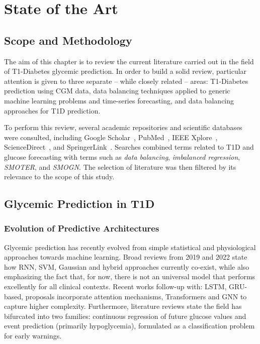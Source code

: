 
\chapter{State of the Art}
\label{chap:SoA}

\section{Scope and Methodology}
\label{sec:soa_scope_and_metholodogy}

The aim of this chapter is to review the current literature carried out in the field of T1-Diabetes glycemic prediction. In order to build a solid review, particular attention is given to three separate -- while closely related -- areas: T1-Diabetes prediction using CGM data, data balancing techniques applied to generic machine learning problems and time-series forecasting, and data balancing approaches for T1D prediction.

To perform this review, several academic repositories and scientific databases were consulted, including Google Scholar~\cite{google_scholar}, PubMed~\cite{pubmed}, IEEE Xplore~\cite{ieee_xplore}, ScienceDirect~\cite{sciencedirect}, and SpringerLink~\cite{springerlink}. Searches combined terms related to T1D and glucose forecasting with terms such as \textit{data balancing}, \textit{imbalanced regression}, \textit{SMOTER}, and \textit{SMOGN}. The selection of literature was then filtered by its relevance to the scope of this study.

\section{Glycemic Prediction in T1D}
\label{sec:soa_glycemic_prediction}

\subsection{Evolution of Predictive Architectures}
\label{subsec:soa_prediction_evolution}

Glycemic prediction has recently evolved from simple statistical and physiological approaches towards machine learning. Broad reviews from 2019 \cite{WOLDAREGAY2019109} and 2022 \cite{info:doi/10.2196/34699} state how RNN, SVM, Gaussian and hybrid approaches currently co-exist, while also emphasizing the fact that, for now, there is not an universal model that performs excellently for all clinical contexts. Recent works \cite{WOLDAREGAY2019109, info:doi/10.2196/34699} follow-up with: LSTM, GRU-based, proposals incorporate attention mechanisms, Transformers and GNN to capture higher complexity. Furthermore, literature reviews \cite{info:doi/10.2196/34699} state the field has bifurcated into two families: continuous regression of future glucose values and event prediction (primarily hypoglycemia), formulated as a classification problem for early warnings.

